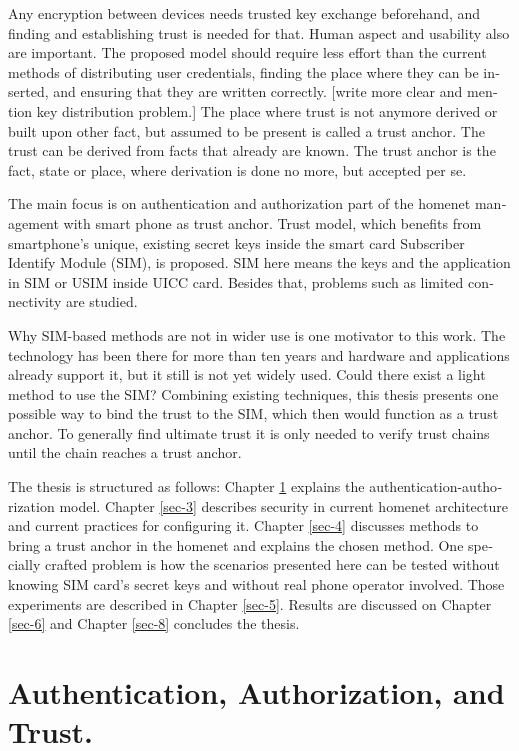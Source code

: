 \documentclass[12pt,a4paper,english]{tutthesis}
\begin{document}
\begin{otherlanguage}{english}
Any encryption between devices needs trusted key exchange
beforehand, and finding and establishing trust is needed for that.
Human aspect and usability also are important. The proposed model should
require less effort than the current methods of distributing user
credentials, finding the place where they can be inserted, and
ensuring that they are written correctly. 
[write more clear and mention key distribution problem.]
The place where trust is not anymore derived or built upon other 
fact, but assumed to be present is called a trust anchor.
The trust can be derived from facts that already are known.
The trust anchor is the fact, state or place, where derivation is
done no more, but accepted per se.


The main focus is on authentication and authorization part of
the homenet management with smart phone as trust anchor.
Trust model, which benefits from smartphone's unique,
existing secret keys inside the smart card Subscriber Identify Module
(SIM), is proposed. 
SIM here means the keys and the application in SIM or USIM inside UICC card. 
Besides that, problems such as limited connectivity are studied. 


Why SIM-based methods are not in wider use is one motivator to this
work.  The technology has been there for more than ten years and
hardware and applications already support it, but it still is not yet
widely used.  Could there exist a light method to use the SIM?  Combining
existing techniques, this thesis presents one possible way to bind the
trust to the SIM, which then would function as a trust anchor. To
generally find ultimate trust it is only needed to verify trust chains
until the chain reaches a trust anchor.




The thesis is structured as follows: Chapter \ref{sec-2} explains the authentication-authorization model.
Chapter \ref{sec-3} describes security in current homenet architecture and 
current practices for configuring it.
 Chapter \ref{sec-4}
discusses methods to bring a trust anchor in the homenet and explains
the chosen method.
One specially crafted problem is how the scenarios presented here can be
tested without knowing SIM card's secret keys and without real phone
operator involved.  Those experiments are described in Chapter
\ref{sec-5}.
Results are discussed on Chapter \ref{sec-6} and Chapter \ref{sec-8} concludes the
thesis.
\chapter{Authentication, Authorization, and Trust.}
\label{sec-2}


\end{otherlanguage}
\end{document}
